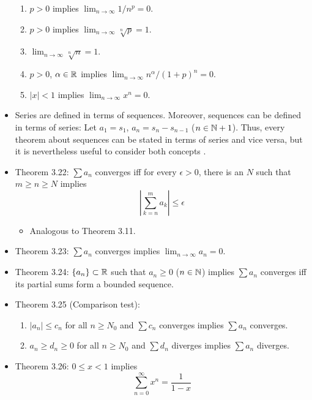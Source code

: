 \documentclass[../../notes.tex]{subfiles}
\begin{document}
\begin{itemize}
    \begin{enumerate}[label={(\alph*)}]
        \item $p>0$ implies $\lim_{n\to\infty}1/n^p=0$.
        \item $p>0$ implies $\lim_{n\to\infty}\sqrt[n]{p}=1$.
        \item $\lim_{n\to\infty}\sqrt[n]{n}=1$.
        \item $p>0$, $\alpha\in\mathbb{R}$ implies $\lim_{n\to\infty}n^\alpha/(1+p)^n=0$.
        \item $|x|<1$ implies $\lim_{n\to\infty}x^n=0$.
    \end{enumerate}
    \item {}Series are defined in terms of sequences. Moreover, sequences can be defined in terms of series: Let $a_1=s_1$, $a_n=s_n-s_{n-1}$ ($n\in\mathbb{N}+1$). Thus, every theorem about sequences can be stated in terms of series and vice versa, but it is nevertheless useful to consider both concepts \parencite[59]{bib:Rudin}.
    \item Theorem 3.22: $\sum a_n$ converges iff for every $\epsilon>0$, there is an $N$ such that $m\geq n\geq N$ implies
    \begin{equation*}
        \left| \sum_{k=n}^ma_k \right| \leq \epsilon
    \end{equation*}
    \begin{itemize}
        \item Analogous to Theorem 3.11.
    \end{itemize}
    \item Theorem 3.23: $\sum a_n$ converges implies $\lim_{n\to\infty}a_n=0$.
    \item Theorem 3.24: $\{a_n\}\subset\mathbb{R}$ such that $a_n\geq 0$ ($n\in\mathbb{N}$) implies $\sum a_n$ converges iff its partial sums form a bounded sequence.
    \item Theorem 3.25 (Comparison test):
    \begin{enumerate}[label={(\alph*)}]
        \item $|a_n|\leq c_n$ for all $n\geq N_0$ and $\sum c_n$ converges implies $\sum a_n$ converges.
        \item $a_n\geq d_n\geq 0$ for all $n\geq N_0$ and $\sum d_n$ diverges implies $\sum a_n$ diverges.
    \end{enumerate}
    \item Theorem 3.26: $0\leq x<1$ implies
    \begin{equation*}
        \sum_{n=0}^\infty x^n = \frac{1}{1-x}
    \end{equation*}

\end{itemize}
\end{document}
